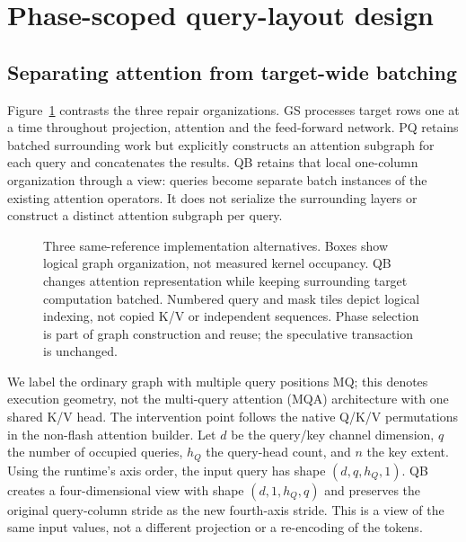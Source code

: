 \section{Phase-scoped query-layout design}
\label{sec:method}
\subsection{Separating attention from target-wide batching}
Figure~\ref{fig:design} contrasts the three repair organizations. GS processes target rows one at a time throughout projection, attention and the feed-forward network. PQ retains batched surrounding work but explicitly constructs an attention subgraph for each query and concatenates the results. QB retains that local one-column organization through a view: queries become separate batch instances of the existing attention operators. It does not serialize the surrounding layers or construct a distinct attention subgraph per query.

\begin{figure}[t]
\centering
\caption{Three same-reference implementation alternatives. Boxes show logical graph organization, not measured kernel occupancy. QB changes attention representation while keeping surrounding target computation batched. Numbered query and mask tiles depict logical indexing, not copied K/V or independent sequences. Phase selection is part of graph construction and reuse; the speculative transaction is unchanged.}
\label{fig:design}
\end{figure}

We label the ordinary graph with multiple query positions MQ; this denotes execution geometry, not the multi-query attention (MQA) architecture with one shared K/V head. The intervention point follows the native Q/K/V permutations in the non-flash attention builder. Let $d$ be the query/key channel dimension, $q$ the number of occupied queries, $h_Q$ the query-head count, and $n$ the key extent. Using the runtime's axis order, the input query has shape $(d,q,h_Q, 1)$. QB creates a four-dimensional view with shape $(d, 1,h_Q,q)$ and preserves the original query-column stride as the new fourth-axis stride. This is a view of the same input values, not a different projection or a re-encoding of the tokens.

